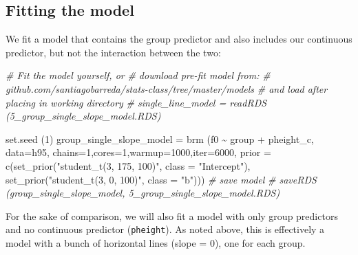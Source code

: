 \documentclass[
]{book}
\newenvironment{Shaded}{\begin{snugshade}}{\end{snugshade}}
\newcommand{\AttributeTok}[1]{\textcolor[rgb]{0.77,0.63,0.00}{#1}}
\newcommand{\CommentTok}[1]{\textcolor[rgb]{0.56,0.35,0.01}{\textit{#1}}}
\newcommand{\DecValTok}[1]{\textcolor[rgb]{0.00,0.00,0.81}{#1}}
\newcommand{\FunctionTok}[1]{\textcolor[rgb]{0.00,0.00,0.00}{#1}}
\newcommand{\NormalTok}[1]{#1}
\newcommand{\OtherTok}[1]{\textcolor[rgb]{0.56,0.35,0.01}{#1}}
\newcommand{\SpecialCharTok}[1]{\textcolor[rgb]{0.00,0.00,0.00}{#1}}
\newcommand{\StringTok}[1]{\textcolor[rgb]{0.31,0.60,0.02}{#1}}
\begin{document}
\hypertarget{fitting-the-model-4}{%
\subsection{Fitting the model}\label{fitting-the-model-4}}

We fit a model that contains the group predictor and also includes our continuous predictor, but not the interaction between the two:

\begin{Shaded}
\begin{Highlighting}[]
\CommentTok{\# Fit the model yourself, or}
\CommentTok{\# download pre{-}fit model from: }
\CommentTok{\# github.com/santiagobarreda/stats{-}class/tree/master/models}
\CommentTok{\# and load after placing in working directory}
\CommentTok{\# single\_line\_model = readRDS (\textquotesingle{}5\_group\_single\_slope\_model.RDS\textquotesingle{})}

\FunctionTok{set.seed}\NormalTok{ (}\DecValTok{1}\NormalTok{)}
\NormalTok{group\_single\_slope\_model }\OtherTok{=}
  \FunctionTok{brm}\NormalTok{ (f0 }\SpecialCharTok{\textasciitilde{}}\NormalTok{ group }\SpecialCharTok{+}\NormalTok{ pheight\_c, }
       \AttributeTok{data=}\NormalTok{h95, }\AttributeTok{chains=}\DecValTok{1}\NormalTok{,}\AttributeTok{cores=}\DecValTok{1}\NormalTok{,}\AttributeTok{warmup=}\DecValTok{1000}\NormalTok{,}\AttributeTok{iter=}\DecValTok{6000}\NormalTok{,}
       \AttributeTok{prior =} \FunctionTok{c}\NormalTok{(}\FunctionTok{set\_prior}\NormalTok{(}\StringTok{"student\_t(3, 175, 100)"}\NormalTok{, }\AttributeTok{class =} \StringTok{"Intercept"}\NormalTok{),}
                 \FunctionTok{set\_prior}\NormalTok{(}\StringTok{"student\_t(3, 0, 100)"}\NormalTok{, }\AttributeTok{class =} \StringTok{"b"}\NormalTok{)))}
\CommentTok{\# save model}
\CommentTok{\# saveRDS (group\_single\_slope\_model, \textquotesingle{}5\_group\_single\_slope\_model.RDS\textquotesingle{})}
\end{Highlighting}
\end{Shaded}

For the sake of comparison, we will also fit a model with only group predictors and no continuous predictor (\texttt{pheight}). As noted above, this is effectively a model with a bunch of horizontal lines (slope = 0), one for each group.
\end{document}
